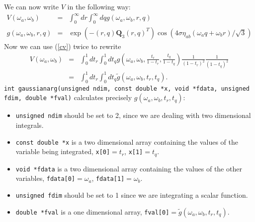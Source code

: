 \documentclass[10pt,letterpaper]{article}
\begin{document}
We can now write $V$ in the following way:
\begin{eqnarray}
V(\omega_a,\omega_b)&=& \int_0^{\infty} dr \int_0^{\infty} dq g(\omega_a,\omega_b,r,q)\\
g(\omega_a,\omega_b,r,q)&=&\exp\left(-(r,q) \mathbf{Q}_3 (r,q)^T \right) \cos\left(4 \sigma \eta_{ab}( \omega_a q+ \omega_b r)/\sqrt{3}  \right)\nonumber
\end{eqnarray}
Now we can use (\ref{cv}) twice to rewrite
\begin{eqnarray}\label{int}
V(\omega_a,\omega_b)&=& \int_0^{1} dt_r \int_0^{1} dt_q g\left(\omega_a,\omega_b,\frac{t_r}{1-t_r},\frac{t_q}{1-t_q}\right) \frac{1}{(1-t_r)^2} \frac{1}{(1-t_q)^2}\\
&=&\int_0^{1} dt_r \int_0^{1} dt_q \tilde g(\omega_a,\omega_b,t_r,t_q).
\end{eqnarray}
\verb|int gaussianarg(unsigned ndim, const double *x, void *fdata, unsigned fdim, double *fval)| calculates precisely $g(\omega_a,\omega_b,t_r,t_q)$:
\begin{itemize}
\item  \verb|unsigned ndim| should be set to 2, since we are dealing with two dimensional integrals.
\item  \verb|const double *x| is a two dimensional array containing the values of the variable being integrated, \verb|x[0]|$=t_r$, \verb|x[1]|$=t_q$.
\item  \verb|void *fdata| is a two dimensional array containing the values of the other variables, \verb|fdata[0]|$=\omega_a$, \verb|fdata[1]|$=\omega_b$.
\item  \verb|unsigned fdim| should be set to 1 since we are integrating a scalar function.
\item  \verb|double *fval| is a one dimensional array, \verb|fval[0]|$=\tilde g(\omega_a,\omega_b,t_r,t_q)$.
\end{itemize}
\end{document}
